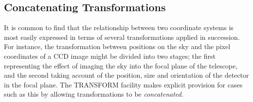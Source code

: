 \documentclass[twoside,11pt]{article}
\newcommand{\xlabel}[1]{}
\renewcommand{\_}{\texttt{\symbol{95}}}
\newcommand{\name}[1]{\mbox{\small{#1}}}
\begin{document}
\subsection{\xlabel{concatenating_transformations}Concatenating Transformations}

\label{section:additional:concatenate}

It is common to find that the relationship between two coordinate systems is
most easily expressed in terms of several transformations applied in
succession.
For instance, the transformation between positions on the sky and the pixel
coordinates of a \name{CCD} image might be divided into two stages; the
first representing the effect of imaging the sky into the focal plane of the
telescope, and the second taking account of the position, size and
orientation of the detector in the focal plane.
The \name{TRANSFORM} facility makes explicit provision for cases such as
this by allowing transformations to be \emph{concatenated}.
\end{document}
